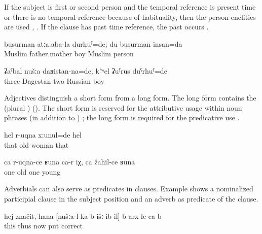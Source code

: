If the subject is first or second person and the temporal reference is present time or there is no temporal reference because of habituality, then the person enclitics are used , . If the clause has past time reference, the past  occurs .
%
\begin{exe}
	\ex	\label{ex:‎I was the son of Muslim parents; I am a Muslim}
	\gll	busurman	atːa.aba-la	durħuˁ=de; du	busurman	insan=da\\
		Muslim father.mother	boy		Muslim	person		\\
	\glt	{}

	\ex	\label{ex:‎We three were from Daghestan, and there were two Russian guys}
	\gll	ʡaˁbal	nušːa	daʁistan-na=de,	k'ʷel	ʡuˁrus	duˁrħuˁ=de\\
		three		Dagestan	two	Russian	boy\\
	\glt	{}
\end{exe}


Adjectives distinguish a short form from a long form. The long form contains the   (plural ) (). The short form is reserved for the attributive usage within noun phrases (in addition to ) ; the long form is required for the predicative use . 
%
\begin{exe}
	\ex	\label{ex:‎‎‎She was an old woman}
	\gll	hel	r-uqna	xːunul=de	hel\\
		that	old	woman	that\\
	\glt	{}

	\ex	\label{ex:One is like old, one like young}
	\gll	ca	r-uqna-ce	ʁuna	ca-r	iχ,	ca	žahil-ce	ʁuna\\
		one	old				one	young		\\
	\glt	{}
\end{exe}

Adverbials can also serve as predicates in  clauses. Example  shows a nominalized participial clause in the subject position and an adverb as predicate of the  clause.
%
\begin{exe}
	\ex	\label{ex:‎This means, how we put (the pictures) down is correct}
	\gll	hej	značit,	hana	[nušːa-l	ka-b-išː-ib-il]	b-arx-le	ca-b\\
		this	thus	now		put	correct	\\
	\glt	{}
\end{exe}

